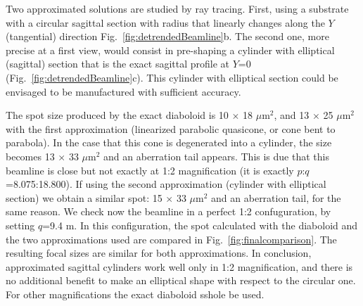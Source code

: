 \documentclass{iucr}              %
\begin{document}
Two approximated solutions are studied by ray tracing. First, using a substrate with a circular sagittal section with radius that linearly changes along the $Y$ (tangential) direction Fig.~\ref{fig:detrendedBeamline}b. The second one, more precise at a first view, would consist in pre-shaping a cylinder with elliptical (sagittal) section that is the exact sagittal profile at $Y$=0 (Fig.~\ref{fig:detrendedBeamline}c).  This cylinder with elliptical section could be envisaged to be manufactured with sufficient accuracy. 

The spot size produced by the exact diaboloid is 10 $\times$ 18 $\mu$m$^2$, and 13 $\times$ 25 $\mu$m$^2$ with the first approximation (linearized parabolic quasicone, or cone bent to parabola). In the case that this cone is degenerated into a cylinder, the size becomes 13 $\times$ 33 $\mu$m$^2$ and an aberration tail appears. This is due that this beamline is close but not exactly at 1:2 magnification (it is exactly $p$:$q$=8.075:18.800). If using the second approximation (cylinder with elliptical section) we obtain a similar spot: 15 $\times$ 33 $\mu$m$^2$ and an aberration tail, for the same reason. We check now the beamline in a perfect 1:2 confuguration, by setting $q$=9.4 m. In this configuration, the spot calculated with the diaboloid and the two approximations used are compared in Fig.~\ref{fig:finalcomparison}. The resulting focal sizes are similar for both approximations. In conclusion, approximated sagittal cylinders work well only in 1:2 magnification, and there is no additional benefit to make an elliptical shape with respect to the circular one. For other magnifications the exact diaboloid sshole be used.   
\end{document}
